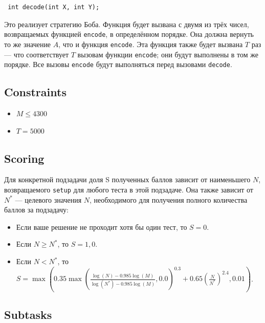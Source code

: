 \documentclass[12pt]{article}
\begin{document}
\begin{lstlisting}
 int decode(int X, int Y);
\end{lstlisting}

Это реализует стратегию Боба. Функция будет вызвана с двумя из трёх чисел, возвращаемых функцией \texttt{encode}, в определённом порядке. Она должна вернуть то же значение $A$, что и функция \texttt{encode}. Эта функция также будет вызвана $T$ раз — что соответствует $T$ вызовам функции \texttt{encode}; они будут выполнены в том же порядке. Все вызовы \texttt{encode} будут выполняться перед вызовами \texttt{decode}.

\subsection{Constraints}

\begin{itemize}
\item $M \leq 4300$
\item $T = 5000$
\end{itemize}

\subsection{Scoring}

Для конкретной подзадачи доля S полученных баллов зависит от наименьшего $N$, возвращаемого \texttt{setup} для любого теста в этой подзадаче. Она также зависит от $N^*$ — целевого значения $N$, необходимого для получения полного количества баллов за подзадачу:

\begin{itemize}
\item Если ваше решение не проходит хотя бы один тест, то $S = 0$.
\item Если $N \geq N^*$, то $S = 1,0$.
\item Если $N < N^*$, то $S = \max\left(0.35 \max\left(\frac{\log(N) - 0.985 \log(M)}{\log(N^*) - 0.985 \log(M)}, 0.0\right)^{0.3} + 0.65 \left(\frac{N}{N^*}\right)^{2.4}, 0.01\right)$.
\end{itemize}

\subsection{Subtasks}
\end{document}
